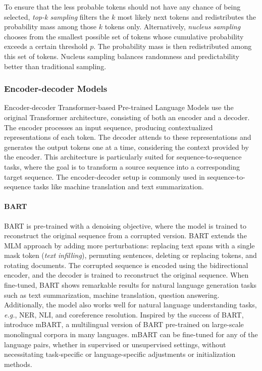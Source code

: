 To ensure that the less probable tokens should not have any chance of being selected, \textit{top-k sampling} \citep{fan2018hierarchical} filters the $k$ most likely next tokens and redistributes the probability mass among those $k$ tokens only. Alternatively, \textit{nucleus sampling} chooses from the smallest possible set of tokens whose cumulative probability exceeds a certain threshold $p$. The probability mass is then redistributed among this set of tokens. Nucleus sampling balances randomness and predictability better than traditional sampling.

\subsubsection{Encoder-decoder Models}
\label{section:related-pretrained-language-models-ed-models}

Encoder-decoder Transformer-based Pre-trained Language Models use the original Transformer architecture, consisting of both an encoder and a decoder. The encoder processes an input sequence, producing contextualized representations of each token. The decoder attends to these representations and generates the output tokens one at a time, considering the context provided by the encoder. This architecture is particularly suited for sequence-to-sequence tasks, where the goal is to transform a source sequence into a corresponding target sequence. The encoder-decoder setup is commonly used in sequence-to-sequence tasks like machine translation and text summarization.

\paragraph{BART} \ac{BART} \citep{lewis2019bart} is pre-trained with a denoising objective, where the model is trained to reconstruct the original sequence from a corrupted version. \ac{BART} extends the \ac{MLM} approach by adding more perturbations: replacing text spans with a single mask token (\textit{text infilling}), permuting sentences, deleting or replacing tokens, and rotating documents. The corrupted sequence is encoded using the bidirectional encoder, and the decoder is trained to reconstruct the original sequence. When fine-tuned, \ac{BART} shows remarkable results for natural language generation tasks such as text summarization, machine translation, question answering. Additionally, the model also works well for natural language understanding tasks, \textit{e.g.}, \ac{NER}, \ac{NLI}, and coreference resolution. Inspired by the success of \ac{BART}, \citet{liu2020multilingual} introduce mBART, a multilingual version of \ac{BART} pre-trained on large-scale monolingual corpora in many languages. mBART can be fine-tuned for any of the language pairs, whether in supervised or unsupervised settings, without necessitating task-specific or language-specific adjustments or initialization methods.

